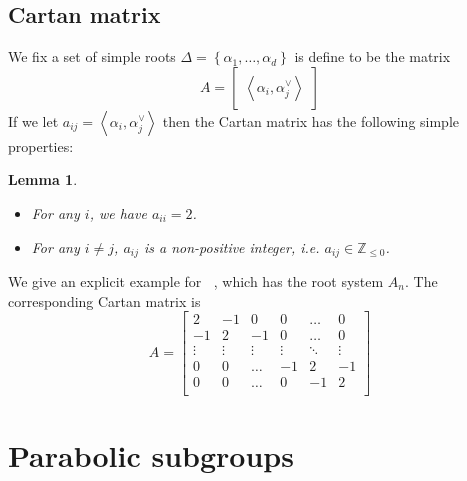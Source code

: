 \documentclass[12pt]{article} %
\newtheorem{lemma}[definition]{Lemma}
\DeclareMathOperator{\slnr}{\mathfrak{sl}_n(\mathbb{R})}
\begin{document}
\subsection{Cartan matrix}
We fix a set of simple roots $\Delta = \left\lbrace \alpha_1,\ldots,\alpha_d \right\rbrace$ is define to be the matrix
\[A = \begin{bmatrix} \left\langle \alpha_i,\alpha_j^\vee  \right\rangle
    \end{bmatrix}\]
If we let $a_{ij}=  \left\langle \alpha_i,\alpha_j^\vee\right\rangle$ then the Cartan matrix has the following simple properties:
\begin{lemma}
    \hfill
    \begin{itemize}
        \item For any $i$, we have $a_{ii}=2$.
        \item For any $i \ne j$, $a_{ij}$ is a non-positive integer, i.e. $a_{ij} \in \mathbb{Z}_{\le 0}$.
    \end{itemize}
\end{lemma}
We give an explicit example for $\slnr$, which has the root system $A_n$. The corresponding Cartan matrix is
\[A = \begin{bmatrix}
        2      & -1     & 0      & 0      & \ldots & 0      \\
        -1     & 2      & -1     & 0      & \ldots & 0      \\
        \vdots & \vdots & \vdots & \vdots & \ddots & \vdots \\
        0      & 0      & \ldots & -1     & 2      & -1     \\
        0      & 0      & \ldots & 0     & -1      & 2     \\
    \end{bmatrix}\]
\section{Parabolic subgroups}
\end{document}
